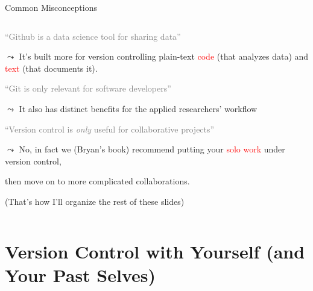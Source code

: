 \documentclass[ignorenonframetext, 10pt, aspectratio=169]{beamer}
\begin{document}
\begin{frame}{Common Misconceptions}
\begin{columns}
\begin{column}{0.8\textwidth}
\begin{wideenumerate}
\item \textcolor{gray}{``Github is a data science tool for sharing data''}
\begin{wideitemize}
\item[{}] $\leadsto$ \pause It's built more for version controlling plain-text \textcolor{red}{code} (that analyzes data) and \textcolor{red}{text} (that documents it).
\end{wideitemize}
\item \textcolor{gray}{``Git is only relevant for software developers''}
\begin{wideitemize}
\item[{}] $\leadsto$ \pause It also has distinct benefits for the applied researchers' workflow
\end{wideitemize}
\item \textcolor{gray}{``Version control is \emph{only} useful for collaborative projects''}
\begin{wideitemize}
\item[{}] $\leadsto$ \pause No, in fact we (Bryan's book) recommend putting your \textcolor{red}{solo work} under version control,
\item[{}] then move on to more complicated collaborations. 
\item[{}] {(That's how I'll organize the rest of these slides)}
\end{wideitemize}
\end{wideenumerate}
\end{column}
\end{columns}
\end{frame}


\section{Version Control with Yourself (and Your Past Selves)}
\end{document}
